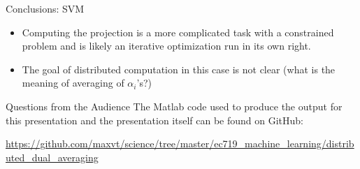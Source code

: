 \documentclass{beamer}
\begin{document}
	\begin{frame}{Conclusions: SVM}
		\begin{itemize}
			\item	Computing the projection is a more complicated task with a constrained problem and
				is likely an iterative optimization run in its own right.
			\item The goal of distributed computation in this case is not clear (what is the meaning of
				averaging of $\alpha_i$'s?)
		\end{itemize}			
	\end{frame}	
	
	\begin{frame}{Questions from the Audience}
		The Matlab code used to produce the output for this presentation and the presentation itself
		can be found on GitHub:
		
		\begin{block}{}
		\url{https://github.com/maxvt/science/tree/master/ec719_machine_learning/distributed_dual_averaging}
		\end{block}
	\end{frame}
\end{document}
